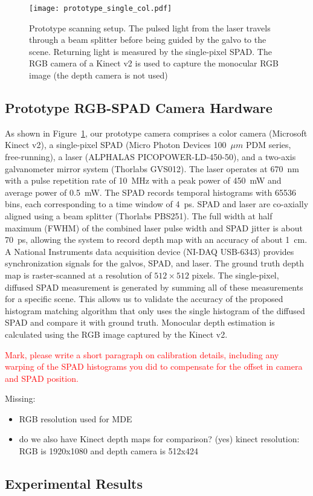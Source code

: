\begin{figure}[H]
  \texttt{[image: prototype\_single\_col.pdf]}
  \caption{Prototype scanning setup. The pulsed light from the laser travels
    through a beam splitter before being guided by the galvo to the scene.
    Returning light is measured by the single-pixel SPAD. The RGB camera of a
    Kinect v2 is used to capture the monocular RGB image (the depth camera is
    not used)}
  \label{fig:prototype}
\end{figure}

\subsection{Prototype RGB-SPAD Camera Hardware}


As shown in Figure~\ref{fig:prototype}, our prototype camera comprises a color camera (Microsoft Kinect v2), a single-pixel SPAD (Micro Photon Devices 100~$\mu m$ PDM series, free-running), a laser (ALPHALAS PICOPOWER-LD-450-50), and a two-axis galvanometer mirror system (Thorlabs GVS012). The laser operates at 670~nm with a pulse repetition rate of 10~MHz with a peak power of 450~mW and average power of 0.5~mW. The SPAD records temporal histograms with 65536 bins, each corresponding to a time window of 4~ps. SPAD and laser are co-axially aligned using a beam splitter (Thorlabs PBS251). The full width at half maximum (FWHM) of the combined laser pulse width and SPAD jitter is about 70~ps, allowing the system to record depth map with an accuracy of about 1~cm. A National Instruments data acquisition device (NI-DAQ USB-6343) provides synchronization signals for the galvos, SPAD, and laser. The ground truth depth map is raster-scanned at a resolution of $512 \times 512$ pixels. The single-pixel, diffused SPAD measurement is generated by summing all of these measurements for a specific scene. This allows us to validate the accuracy of the proposed histogram matching algorithm that only uses the single histogram of the diffused SPAD and compare it with ground truth. Monocular depth estimation is calculated using the RGB image captured by the Kinect v2.

\textcolor{red}{Mark, please write a short paragraph on calibration details, including any warping of the SPAD histograms you did to compensate for the offset in camera and SPAD position.}

Missing:
%
\begin{itemize}
\item RGB resolution used for MDE
\item do we also have Kinect depth maps for comparison? (yes) kinect resolution: RGB is 1920x1080 and depth camera is 512x424
\end{itemize}

\subsection{Experimental Results}
